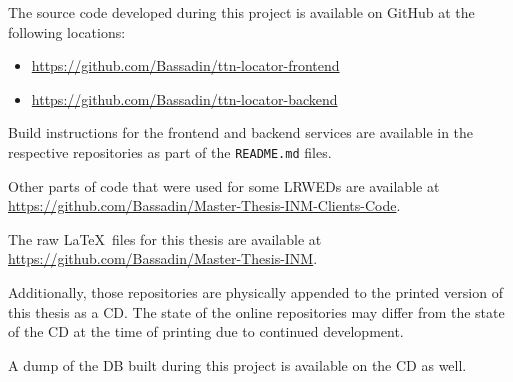 
The source code developed during this project is available on GitHub at the following locations:

\begin{itemize}
    \item \url{https://github.com/Bassadin/ttn-locator-frontend}
    \item \url{https://github.com/Bassadin/ttn-locator-backend}
\end{itemize}

Build instructions for the frontend and backend services are available in the respective repositories as part of the \texttt{README.md} files.

Other parts of code that were used for some \aclp{LRWED} are available at \url{https://github.com/Bassadin/Master-Thesis-INM-Clients-Code}.

The raw \LaTeX~files for this thesis are available at \url{https://github.com/Bassadin/Master-Thesis-INM}.

Additionally, those repositories are physically appended to the printed version of this thesis as a CD\@.
The state of the online repositories may differ from the state of the CD at the time of printing due to continued development.

A dump of the \acl{DB} built during this project is available on the CD as well.